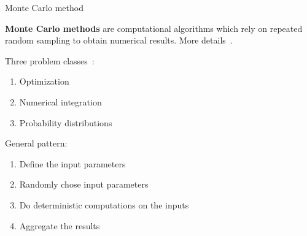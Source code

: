 \documentclass[\classoption]{beamer}
\begin{document}
\begin{frame}{Monte Carlo method}

\textbf{Monte Carlo methods} are computational algorithms which rely on repeated random sampling to obtain numerical results. More details~\cite{shonkwiler2009explorations}.

\begin{block}{Three problem classes~\cite{kroese2014monte}:}
\begin{enumerate}
\item Optimization
\item Numerical integration
\item Probability distributions
\end{enumerate}
\end{block}

\begin{block}{General pattern:}
\begin{enumerate}
\item Define the input parameters
\item Randomly chose input parameters   
\item Do deterministic computations on the inputs
\item Aggregate the results
\end{enumerate}
\end{block}
\end{frame}
\end{document}
